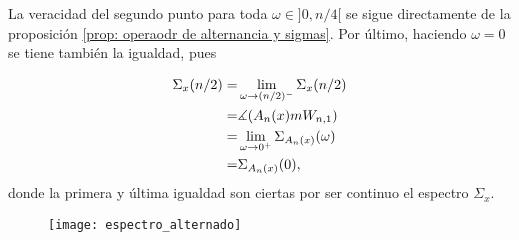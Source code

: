 La veracidad del segundo punto para toda
$\omega \in ]0, n/4[$ se sigue directamente de 
la proposición 
\ref{prop: operaodr de alternancia y sigmas}. Por último,
haciendo $\omega = 0$ se tiene también la igualdad, pues

\begin{align*}
\Sigma_{x}(n/2) = &
\lim\limits_{\omega \rightarrow (n/2)^{-}}{\Sigma_{x}(n/2)} \\
= & \measuredangle(A_{n}(x)m W_{n,1}) \\
= & \lim\limits_{\omega \rightarrow 0^{+}}{ \Sigma_{A_{n}(x)}(\omega)} \\
= & \Sigma_{A_{n}(x)}(0),
\end{align*}
donde la primera y última igualdad son ciertas
por ser continuo el espectro $\Sigma_{x}$.
\QEDB
\vspace{0.2cm}

\begin{figure}[H]
	\centering
	\texttt{[image: espectro\_alternado]} 
\end{figure}	
